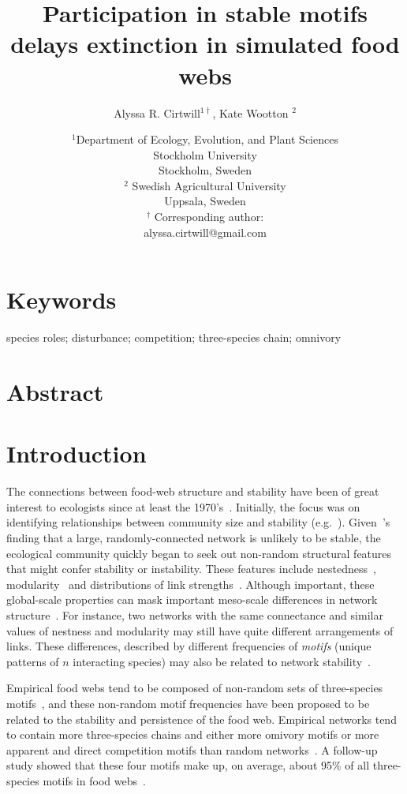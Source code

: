 \documentclass[12pt]{article}
\title{Participation in stable motifs delays extinction in simulated food webs}
\author{Alyssa R. Cirtwill$^{1\dagger}$, Kate Wootton $^{2}$}
\date{\small$^1$Department of Ecology, Evolution, and Plant Sciences\\ 
Stockholm University\\
Stockholm, Sweden\\
\medskip
\small$^2$ Swedish Agricultural University\\
Uppsala, Sweden\\
\medskip
$^\dagger$ Corresponding author:\\
alyssa.cirtwill@gmail.com\\
 }
\begin{document}
 
\maketitle 
\raggedright
\setlength{\parindent}{15pt} 


\section{Keywords}

	species roles; disturbance; competition; three-species chain; omnivory


\section{Abstract}


\section{Introduction}

	The connections between food-web structure and stability have been of great interest to ecologists since at least the 1970's~\citep{May1972}. Initially, the focus was on identifying relationships between community size and stability (e.g.~\citealp{Gardner1970,May1972}). Given~\citet{May1972}'s finding that a large, randomly-connected network is unlikely to be stable, the ecological community quickly began to seek out non-random structural features that might confer stability or instability. These features include nestedness~\citep{Allesina2012,Sauve2014}, modularity~\citep{Sauve2014,Thebault2010} and distributions of link strengths~\citep{McCann1998,Gross2009,Rooney2012,Wootton2016}. Although important, these global-scale properties can mask important meso-scale differences in network structure~\citep{Simmons2019}. For instance, two networks with the same connectance and similar values of nestness and modularity may still have quite different arrangements of links. These differences, described by different frequencies of \emph{motifs} (unique patterns of $n$ interacting species) may also be related to network stability~\citep{Prill2005,Borrelli2015,Monteiro2016}. 


	Empirical food webs tend to be composed of non-random sets of three-species motifs~\citep{Stouffer2007}, and these non-random motif frequencies have been proposed to be related to the stability and persistence of the food web. Empirical networks tend to contain more three-species chains and either more omivory motifs or more apparent and direct competition motifs than random networks~\citep{Stouffer2007}. A follow-up study showed that these four motifs make up, on average, about 95\% of all three-species motifs in food webs~\citep{Stouffer2010b}. 
\end{document}
